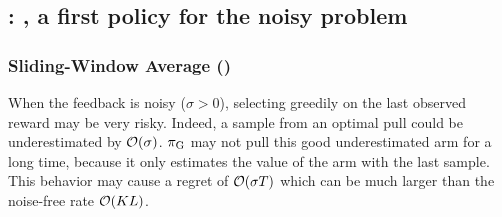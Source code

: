 \subsection{\citet{levine2017rotting}: {\wSWA}, a first policy for the noisy problem}
\label{ss:SWA}
\subsubsection{Sliding-Window Average ({\SWA})}
When the feedback is noisy ($\sigma > 0$), selecting greedily on the last observed reward may be very risky. Indeed, a sample from an optimal pull could be underestimated by $\mathcal{O}(\sigma)$. $\pi_{\rm G}$ may not pull this good underestimated arm for a long time, because it only estimates the value of the arm with the last sample. This behavior may cause a regret of $\mathcal{O}(\sigma T)$ which can be much larger than the noise-free rate $\mathcal{O}(KL)$.

